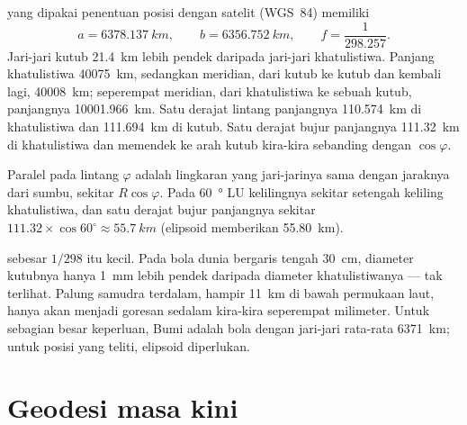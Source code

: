 \begin{proposition}\label{prop:g10:measuring-the-earth:dimensions}
 yang dipakai penentuan posisi dengan satelit (WGS~84) memiliki
\[
  a = \qty{6378.137}{km}, \qquad b = \qty{6356.752}{km}, \qquad
  f = \frac{1}{298.257}.
\]
Jari-jari kutub \qty{21.4}{km} lebih pendek daripada jari-jari khatulistiwa.
Panjang khatulistiwa \qty{40075}{km}, sedangkan meridian, dari kutub ke kutub
dan kembali lagi, \qty{40008}{km}; seperempat meridian, dari khatulistiwa ke
sebuah kutub, panjangnya \qty{10001.966}{km}. Satu derajat lintang panjangnya
\qty{110.574}{km} di khatulistiwa dan \qty{111.694}{km} di kutub. Satu
derajat bujur panjangnya \qty{111.32}{km} di khatulistiwa dan memendek ke arah
kutub kira-kira sebanding dengan $\cos \varphi$.
\end{proposition}

\begin{example}\label{ex:g10:measuring-the-earth:longitude}
Paralel pada lintang $\varphi$ adalah lingkaran yang jari-jarinya sama dengan
jaraknya dari sumbu, sekitar $R \cos \varphi$. Pada \qty{60}{\degree} LU
kelilingnya sekitar setengah keliling khatulistiwa, dan satu derajat bujur
panjangnya sekitar $111.32 \times \cos 60^\circ \approx \qty{55.7}{km}$
(elipsoid memberikan \qty{55.80}{km}).
\end{example}

\begin{remark}\label{rem:g10:measuring-the-earth:round}
 sebesar $1/298$ itu kecil. Pada bola dunia bergaris tengah
\qty{30}{cm}, diameter kutubnya hanya \qty{1}{mm} lebih pendek daripada
diameter khatulistiwanya --- tak terlihat. Palung samudra terdalam, hampir
\qty{11}{km} di bawah permukaan laut, hanya akan menjadi goresan sedalam
kira-kira seperempat milimeter. Untuk sebagian besar keperluan, Bumi adalah
bola dengan jari-jari rata-rata \qty{6371}{km}; untuk posisi yang teliti,
elipsoid diperlukan.
\end{remark}

\section{Geodesi masa kini}

